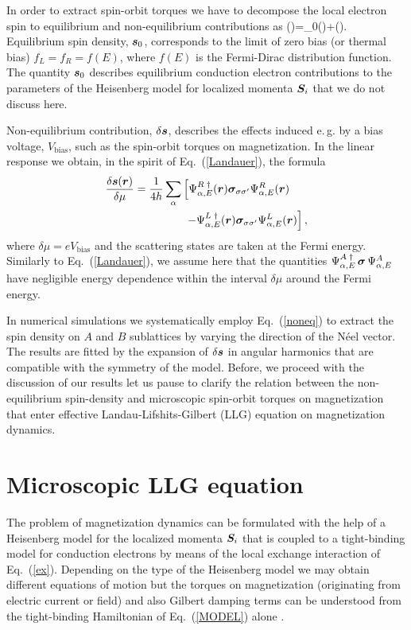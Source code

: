 In order to extract spin-orbit torques we have to decompose the local electron spin to equilibrium and non-equilibrium contributions as
\be
{}()=_0()+\delta{}().
\e
Equilibrium spin density, $\boldsymbol{s}_0$, corresponds to the limit of zero bias (or thermal bias) $f_L=f_R=f(E)$, where $f(E)$ is the Fermi-Dirac distribution function.  The quantity $\boldsymbol{s}_0$ describes equilibrium conduction electron contributions to the parameters of the Heisenberg model for localized momenta $\boldsymbol{S}_i$ that we do not discuss here. 

Non-equilibrium contribution, $\delta\boldsymbol{s}$, describes the effects induced e.\,g. by a bias voltage, $V_\text{bias}$, such as the spin-orbit torques on magnetization. In the linear response we obtain, in the spirit of Eq.~(\ref{Landauer}), the formula
\begin{align}
\frac{\delta\boldsymbol{s}(\boldsymbol{r})}{\delta\mu} =  \frac{1}{4h} \sum_{\alpha}  &\left[\Psi^{R\;\dagger}_{\alpha,E}(\boldsymbol{r}) \boldsymbol{\sigma}_{\sigma\sigma'} \Psi^{R}_{\alpha,E}(\boldsymbol{r}) \right. \nonumber\\
&\; \left. - \Psi^{L\;\dagger}_{\alpha,E}(\boldsymbol{r}) \boldsymbol{\sigma}_{\sigma\sigma'} \Psi^{L}_{\alpha,E}(\boldsymbol{r}) \right],
\label{noneq}
\end{align}
where $\delta\mu=eV_\text{bias}$ and the scattering states are taken at the Fermi energy.  Similarly to Eq.~(\ref{Landauer}), we assume here that the quantities $\Psi^{A\;\dagger}_{\alpha,E} \,\boldsymbol{\sigma}\, \Psi^{A}_{\alpha,E}$  have negligible energy dependence within the interval $\delta\mu$ around the Fermi energy. 

In numerical simulations we systematically employ Eq.~(\ref{noneq}) to extract the spin density on $A$ and $B$ sublattices by varying the direction of the N\'eel vector. The results are fitted by the expansion of $\delta\boldsymbol{s}$ in angular harmonics that are compatible with the symmetry of the model. Before, we proceed with the discussion of our results let us pause to clarify the relation between the non-equilibrium spin-density and microscopic spin-orbit torques on magnetization that enter effective Landau-Lifshits-Gilbert (LLG) equation on magnetization dynamics.

\section{Microscopic LLG equation} 

The problem of magnetization dynamics can be formulated with the help of a Heisenberg model for the localized momenta $\boldsymbol{S}_i$ that is coupled to a tight-binding model for conduction electrons by means of the local exchange interaction of Eq.~(\ref{ex}). Depending on the type of the Heisenberg model we may obtain different equations of motion but the torques on magnetization (originating from electric current or field) and also Gilbert damping terms can be understood from the tight-binding Hamiltonian of Eq.~(\ref{MODEL}) alone \cite{AdoSTTGD2019}. 

